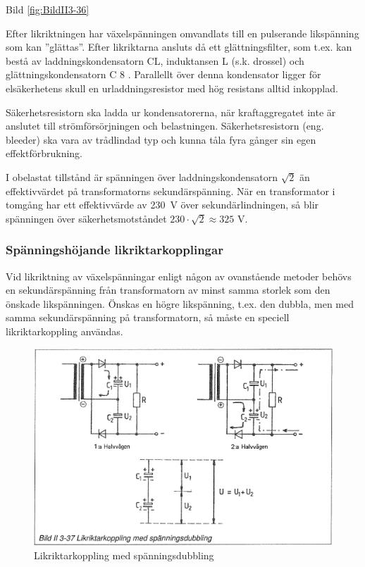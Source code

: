 Bild \ref{fig:BildII3-36}

Efter likriktningen har växelspänningen omvandlats till en pulserande
likspänning som kan ''glättas''. Efter likriktarna ansluts då ett
glättningsfilter, som t.ex. kan bestå av laddningskondensatorn CL,
induktansen L (s.k.  drossel) och glättningskondensatorn C 8 .
Parallellt över denna kondensator ligger för elsäkerhetens skull en
urladdningsresistor med hög resistans alltid inkopplad.

Säkerhetsresistorn ska ladda ur kondensatorerna, när kraftaggregatet
inte är anslutet till strömförsörjningen och
belastningen. Säkerhetsresistorn (eng. bleeder) ska vara av
trådlindad typ och kunna tåla fyra gånger sin egen effektförbrukning.

I obelastat tillstånd är spänningen över laddningskondensatorn
\(\sqrt{2}\) än effektivvärdet på transformatorns
sekundärspänning. När en transformator i tomgång har ett effektivvärde
av 230~V över sekundärlindningen, så blir spänningen över
säkerhetsmotståndet \(230\cdot\sqrt{2} \approx 325\) V.

\subsubsection{Spänningshöjande likriktarkopplingar}

Vid likriktning av växelspänningar enligt någon av ovanstående metoder
behövs en sekundärspänning från transformatorn av minst samma storlek
som den önskade likspänningen. Önskas en högre likspänning, t.ex. den
dubbla, men med samma sekundärspänning på transformatorn, så måste en
speciell likriktarkoppling användas.

\begin{figure}
\includegraphics[width=\textwidth]{images/bild_2_3-37}
\caption{Likriktarkoppling med spänningsdubbling}
\label{fig:BildII3-37}
\end{figure}

